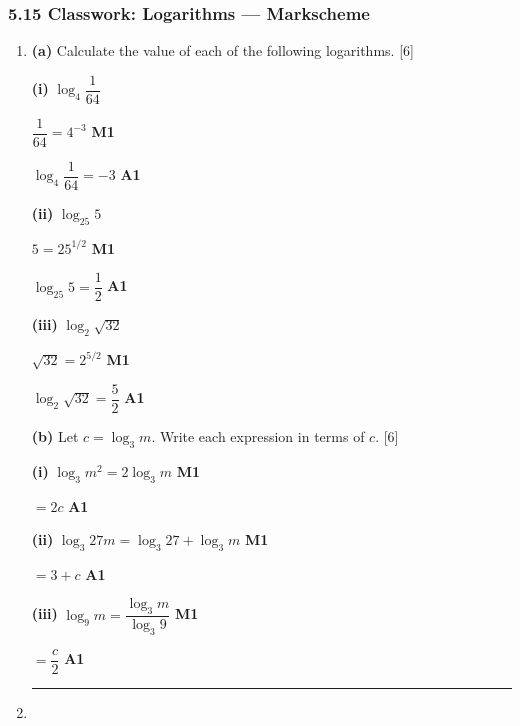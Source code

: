 \documentclass[12pt, twoside]{article}
\begin{document}
\subsubsection*{5.15 Classwork: Logarithms --- Markscheme}

\begin{enumerate}[itemsep=0.3cm]

\item[1.] [Maximum mark: 12]

\medskip

\textbf{(a)} Calculate the value of each of the following logarithms. \hfill [6]

\textbf{(i)} $\log_4 \dfrac{1}{64}$

$\dfrac{1}{64} = 4^{-3}$ \hfill \textbf{M1}

$\log_4 \dfrac{1}{64} = -3$ \hfill \textbf{A1}

\medskip

\textbf{(ii)} $\log_{25} 5$

$5 = 25^{1/2}$ \hfill \textbf{M1}

$\log_{25} 5 = \dfrac{1}{2}$ \hfill \textbf{A1}

\medskip

\textbf{(iii)} $\log_2 \sqrt{32}$

$\sqrt{32} = 2^{5/2}$ \hfill \textbf{M1}

$\log_2 \sqrt{32} = \dfrac{5}{2}$ \hfill \textbf{A1}

\medskip

\textbf{(b)} Let $c = \log_3 m$. Write each expression in terms of $c$. \hfill [6]

\textbf{(i)} $\log_3 m^2 = 2 \log_3 m$ \hfill \textbf{M1}

$= 2c$ \hfill \textbf{A1}

\medskip

\textbf{(ii)} $\log_3 27m = \log_3 27 + \log_3 m$ \hfill \textbf{M1}

$= 3 + c$ \hfill \textbf{A1}

\medskip

\textbf{(iii)} $\log_9 m = \dfrac{\log_3 m}{\log_3 9}$ \hfill \textbf{M1}

$= \dfrac{c}{2}$ \hfill \textbf{A1}

\bigskip
\hrule
\bigskip

\item[2.] [Maximum mark: 7]


\end{enumerate}
\end{document}
